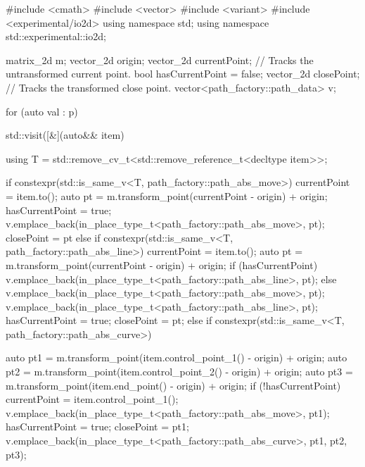 \begin{codeblock}
  #include <cmath>
  #include <vector>
  #include <variant>
  #include <experimental/io2d>
  using namespace std;
  using namespace std::experimental::io2d;
  
  matrix_2d m;
  vector_2d origin;
  vector_2d currentPoint; // Tracks the untransformed current point.
  bool hasCurrentPoint = false;
  vector_2d closePoint;   // Tracks the transformed close point.
  vector<path_factory::path_data> v;
  
  for (auto val : p) {
    std::visit([&](auto&& item) {
      using T = std::remove_cv_t<std::remove_reference_t<decltype item>>;

      if constexpr(std::is_same_v<T, path_factory::path_abs_move>) {
        currentPoint = item.to();
        auto pt = m.transform_point(currentPoint - origin) + origin;
        hasCurrentPoint = true;
        v.emplace_back(in_place_type_t<path_factory::path_abs_move>, pt);
        closePoint = pt
      }
      else if constexpr(std::is_same_v<T, path_factory::path_abs_line>) {
        currentPoint = item.to();
        auto pt = m.transform_point(currentPoint - origin) + origin;
        if (hasCurrentPoint) {
          v.emplace_back(in_place_type_t<path_factory::path_abs_line>, pt);
        }
        else {
          v.emplace_back(in_place_type_t<path_factory::path_abs_move>, pt);
          v.emplace_back(in_place_type_t<path_factory::path_abs_line>, pt);
          hasCurrentPoint = true;
          closePoint = pt;
        }
      }
      else if constexpr(std::is_same_v<T, path_factory::path_abs_curve>) {
        auto pt1 = m.transform_point(item.control_point_1() - origin) + origin;
        auto pt2 = m.transform_point(item.control_point_2() - origin) + origin;
        auto pt3 = m.transform_point(item.end_point() - origin) + origin;
        if (!hasCurrentPoint) {
          currentPoint = item.control_point_1();
          v.emplace_back(in_place_type_t<path_factory::path_abs_move>, pt1);
          hasCurrentPoint = true;
          closePoint = pt1;
        }
        v.emplace_back(in_place_type_t<path_factory::path_abs_curve>, pt1,
          pt2, pt3);
 
}}}
\end{codeblock}
